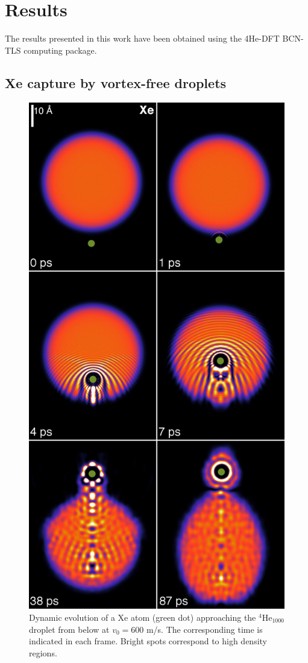 \section{Results}

The results presented in this work have been obtained using the  4He-DFT BCN-TLS computing package\citep{Pi2017}.

\subsection{Xe capture by vortex-free droplets}

\begin{figure}[!]
\centerline{\includegraphics[width=0.6\linewidth,clip]{fig1-Xe-600mps}}
\caption{\label{fig1-capture} 
Dynamic evolution of a Xe atom (green dot) approaching the $^4$He$_{1000}$ 
droplet from below at $v_0 = 600$ m/s. The corresponding time is indicated in each frame. 
Bright spots correspond to high density regions.\citep{ESI} 
}
\end{figure}
%

